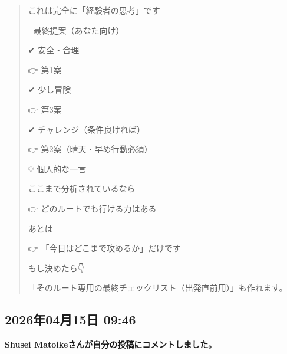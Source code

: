 \begin{quote}
これは完全に「経験者の思考」です

🎯 最終提案（あなた向け）

✔ 安全・合理

👉 第1案

✔ 少し冒険

👉 第3案

✔ チャレンジ（条件良ければ）

👉 第2案（晴天・早め行動必須）

💡 個人的な一言

ここまで分析されているなら

👉 どのルートでも行ける力はある

あとは

👉 「今日はどこまで攻めるか」だけです

もし決めたら👇

「そのルート専用の最終チェックリスト（出発直前用）」も作れます。
\end{quote}

\subsection*{2026年04月15日 09:46}

\textbf{Shusei Matoikeさんが自分の投稿にコメントしました。}

